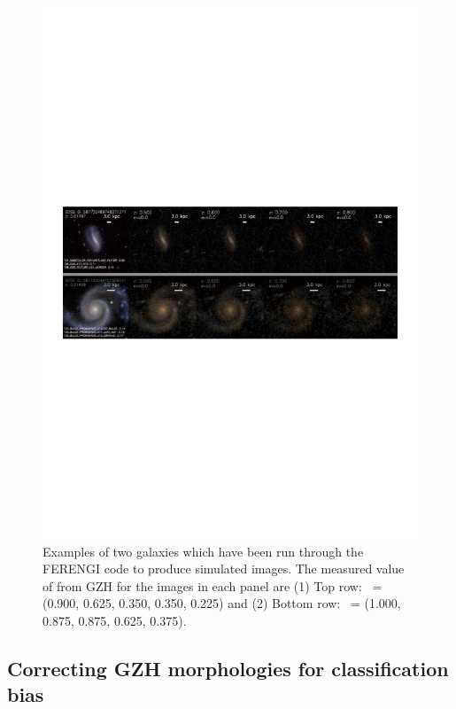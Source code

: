 \documentclass[twocolumn]{aastex6}
\begin{document}
\begin{figure}
\center
\includegraphics[width=160mm]{figures/example_ferengi.pdf}
\caption{Examples of two galaxies which have been run through the FERENGI code to produce simulated \hst{} images. The measured value of \pfeatures{} from GZH for the images in each panel are (1) Top row: \pfeatures~= (0.900, 0.625, 0.350, 0.350, 0.225) and (2) Bottom row: \pfeatures~= (1.000, 0.875, 0.875, 0.625, 0.375). \label{fig:exampleFERENGI}}
\end{figure}

\subsection{Correcting GZH morphologies for classification bias}\label{ssec:zeta}
\end{document}
